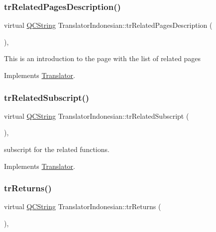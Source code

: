 \subsubsection{\texorpdfstring{trRelatedPagesDescription()}{trRelatedPagesDescription()}}
{\footnotesize\ttfamily virtual \mbox{\hyperlink{class_q_c_string}{Q\+C\+String}} Translator\+Indonesian\+::tr\+Related\+Pages\+Description (\begin{DoxyParamCaption}{ }\end{DoxyParamCaption})\hspace{0.3cm}{\ttfamily [inline]}, {\ttfamily [virtual]}}

This is an introduction to the page with the list of related pages 

Implements \mbox{\hyperlink{class_translator}{Translator}}.

\mbox{\label{class_translator_indonesian_a770929af53e665563d3dcdab70dd29d0}} 
\subsubsection{\texorpdfstring{trRelatedSubscript()}{trRelatedSubscript()}}
{\footnotesize\ttfamily virtual \mbox{\hyperlink{class_q_c_string}{Q\+C\+String}} Translator\+Indonesian\+::tr\+Related\+Subscript (\begin{DoxyParamCaption}{ }\end{DoxyParamCaption})\hspace{0.3cm}{\ttfamily [inline]}, {\ttfamily [virtual]}}

subscript for the related functions. 

Implements \mbox{\hyperlink{class_translator}{Translator}}.

\mbox{\label{class_translator_indonesian_afe5cd0d2cfea2a303baf08f5ef96a074}} 
\subsubsection{\texorpdfstring{trReturns()}{trReturns()}}
{\footnotesize\ttfamily virtual \mbox{\hyperlink{class_q_c_string}{Q\+C\+String}} Translator\+Indonesian\+::tr\+Returns (\begin{DoxyParamCaption}{ }\end{DoxyParamCaption})\hspace{0.3cm}{\ttfamily [inline]}, {\ttfamily [virtual]}}

